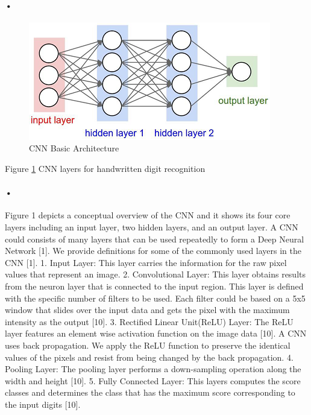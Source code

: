 \documentclass{article}
\begin{document}
\paragraph{•}
\begin{figure}
  \includegraphics[width=\linewidth]{CNNbasicarch.png}
  \caption{CNN Basic Architecture}
  \label{fig:CNN Basic}
\end{figure}

Figure \ref{fig:CNN Basic} CNN layers for handwritten digit recognition 
\paragraph{•}
Figure 1 depicts a conceptual overview of the CNN and it shows its four core layers including an input layer, two hidden layers, and an output layer. A CNN could consists of many layers that can be used repeatedly to form a Deep Neural Network [1]. We provide definitions for some of the commonly used layers in the CNN [1].  
1. Input Layer: This layer carries the information for the raw pixel values that represent an image. 
2. Convolutional Layer: This layer obtains results from the neuron layer that is connected to the input region. This layer is defined with the specific number of filters to be used. Each filter could be based on a 5x5 window that slides over the input data and gets the pixel with the maximum intensity as the output [10]. 
3. Rectified Linear Unit(ReLU) Layer: The ReLU layer features an element wise activation function on the image data [10]. A CNN uses back propagation. We apply the ReLU function to preserve the identical values of the pixels and resist from being changed by the back propagation. 
4. Pooling Layer: The pooling layer performs a down-sampling operation along the width and height [10]. 
5. Fully Connected Layer: This layers computes the score classes and determines the class that has the maximum score corresponding to the input digits [10]. 
 
\end{document}
